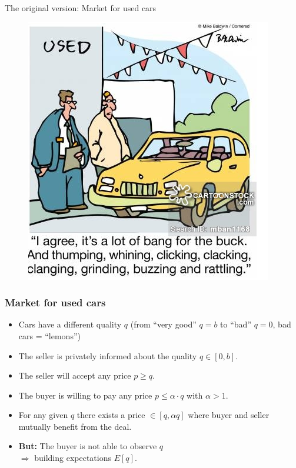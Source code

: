 \documentclass[11pt]{beamer}
\begin{document}
\begin{frame}
\frametitle{\insertsection}

The original version: Market for used cars
\begin{figure}
\includegraphics[width=0.6 \textwidth]{Figures/Cars.png}
\end{figure}
\end{frame}


\begin{frame}
\frametitle{Market for used cars}
\begin{itemize}
\item Cars have a different quality $q$ (from ``very good'' $q=b$ to ``bad'' $q=0$, bad cars = ``lemons'')
\item The seller is privately informed about the quality $q\in[0,b]$.
\item The seller will accept any price $p\geq q$.
\item The buyer is willing to pay any price $p\leq \alpha\cdot q$ with $\alpha>1$.
\item For any given $q$ there exists a price $\in[q,\alpha q]$ where buyer and seller mutually benefit from the deal.
\par\medskip

\item \textbf{But:} The buyer is not able to observe $q$\\ $\Rightarrow$ building expectations $E[q]$.
\end{itemize}

\end{frame}

\end{document}
